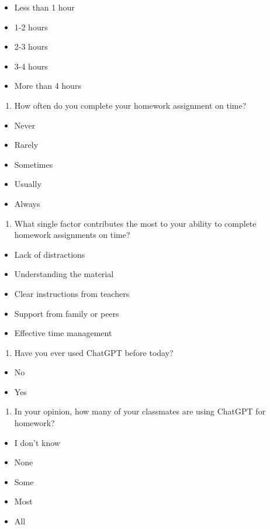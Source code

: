 \documentclass[
  11pt,
]{article}
\providecommand{\tightlist}{%
  \setlength{\itemsep}{0pt}\setlength{\parskip}{0pt}}
\begin{document}
\begin{itemize}
\tightlist
\item
  Less than 1 hour
\item
  1-2 hours
\item
  2-3 hours
\item
  3-4 hours
\item
  More than 4 hours
\end{itemize}

\begin{enumerate}
\def\labelenumi{\arabic{enumi}.}
\setcounter{enumi}{27}
\tightlist
\item
  How often do you complete your homework assignment on time?
\end{enumerate}

\begin{itemize}
\tightlist
\item
  Never
\item
  Rarely
\item
  Sometimes
\item
  Usually
\item
  Always
\end{itemize}

\begin{enumerate}
\def\labelenumi{\arabic{enumi}.}
\setcounter{enumi}{28}
\tightlist
\item
  What single factor contributes the most to your ability to complete homework assignments on time?
\end{enumerate}

\begin{itemize}
\tightlist
\item
  Lack of distractions
\item
  Understanding the material
\item
  Clear instructions from teachers
\item
  Support from family or peers
\item
  Effective time management
\end{itemize}

\begin{enumerate}
\def\labelenumi{\arabic{enumi}.}
\setcounter{enumi}{29}
\tightlist
\item
  Have you ever used ChatGPT before today?
\end{enumerate}

\begin{itemize}
\tightlist
\item
  No
\item
  Yes
\end{itemize}

\begin{enumerate}
\def\labelenumi{\arabic{enumi}.}
\setcounter{enumi}{30}
\tightlist
\item
  In your opinion, how many of your classmates are using ChatGPT for homework?
\end{enumerate}

\begin{itemize}
\tightlist
\item
  I don't know
\item
  None
\item
  Some
\item
  Most
\item
  All
\end{itemize}
\end{document}
